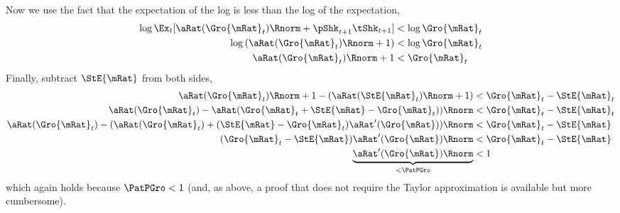 \documentclass[\econtexRoot/BufferStockTheory]{subfiles}
\begin{document}
Now we use the fact that the expectation of the log is less than the log of the expectation, 
\begin{equation}\begin{split}
     \log \Ex_{t}[\aRat(\Gro{\mRat}_{t})\Rnorm+\pShk_{t+1}\tShk_{t+1}] & < \log \Gro{\mRat}_{t}
\\     \log \left(\aRat(\Gro{\mRat}_{t})\Rnorm+1\right) & < \log \Gro{\mRat}_{t}
\\     \aRat(\Gro{\mRat}_{t})\Rnorm+1 & < \Gro{\mRat}_{t}
\end{split}\end{equation}
Finally, subtract $\StE{\mRat}$ from both sides,
\begin{equation}\begin{split}
     \aRat(\Gro{\mRat}_{t})\Rnorm+1 - (\aRat(\StE{\mRat}_{t})\Rnorm+1 )& < \Gro{\mRat}_{t} - \StE{\mRat}_{t}
\\     \aRat(\Gro{\mRat}_{t})-\aRat(\Gro{\mRat}_{t}+\StE{\mRat}-\Gro{\mRat}_{t}))\Rnorm& < \Gro{\mRat}_{t} - \StE{\mRat}_{t}
\\     \aRat(\Gro{\mRat}_{t})-(\aRat(\Gro{\mRat}_{t})+(\StE{\mRat}-\Gro{\mRat}_{t})\aRat^{\prime}(\Gro{\mRat}))\Rnorm& < \Gro{\mRat}_{t} - \StE{\mRat}
\\     (\Gro{\mRat}_{t}-\StE{\mRat})\aRat^{\prime}(\Gro{\mRat})\Rnorm& < \Gro{\mRat}_{t} - \StE{\mRat}
\\     \underbrace{\aRat^{\prime}(\Gro{\mRat})\Rnorm}_{< \PatPGro} & < 1
\end{split}\end{equation}
which again holds because $\PatPGro < 1$ (and, as above, a proof that does not require the Taylor approximation is available but more cumbersome).

\begin{comment}
\subsection{Comment}

Due to the model's nonlinearities the values of $\mRat$ at which the expected growth rate of $\cLevBF$ matches $\PGro$ is very slightly different from the $\mRat$ at which the growth rate at which expected growth of $\mLevBF$ is $\PGro$.  Defining $\grave{\mRat}$ as the $\mRat$ at which $\Ex_{t}[\cRatBF_{t+1}/\cRatBF_{t}]=\PGro$, we can show that to first order $\grave{\mRat} \approx \StE{\mRat}.$
\begin{align*}
  \Ex_{t}[\cFunc(\mRat_{t+1})\pShk_{t+1}] & = \cFunc(\mRat_{t}) \label{eq:balgrostableC}.
  \\ \Ex_{t}[\left(\cFunc(\grave{\mRat})+\cFunc^{\prime}(\grave{\mRat})(\mRat_{t+1}-\grave{\mRat})\right)\pShk_{t+1}] & \approx \cFunc(\grave{\mRat})
  \\ \Ex_{t}[\left(\cFunc^{\prime}(\grave{\mRat})(\mRat_{t+1}-\grave{\mRat})\right)\pShk_{t+1}] & \approx 0
  \\ \Ex_{t}[\mRat_{t+1}] & \approx \grave{\mRat} 
\end{align*}
but at $\mRat=\StE{\mRat}$, $\Ex_{t}[\mRat_{t+1}]=\Trg{\mRat}\approx\grave{\mRat}$.
\end{comment}
\end{document}
